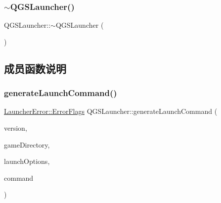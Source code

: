 \mbox{\label{class_q_g_s_launcher_af7cf86d1477700c96475366b8232766d}} 
\subsubsection{\texorpdfstring{$\sim$\+Q\+G\+S\+Launcher()}{~QGSLauncher()}}
{\footnotesize\ttfamily Q\+G\+S\+Launcher\+::$\sim$\+Q\+G\+S\+Launcher (\begin{DoxyParamCaption}{ }\end{DoxyParamCaption})\hspace{0.3cm}{\ttfamily [virtual]}}



\subsection{成员函数说明}
\mbox{\label{class_q_g_s_launcher_a56b1aaf3040498f81a00221cdddb75c0}} 
\subsubsection{\texorpdfstring{generate\+Launch\+Command()}{generateLaunchCommand()}}
{\footnotesize\ttfamily \mbox{\hyperlink{namespace_launcher_error_ac3a8c0329368b890069c60ac80628085}{Launcher\+Error\+::\+Error\+Flags}} Q\+G\+S\+Launcher\+::generate\+Launch\+Command (\begin{DoxyParamCaption}\item[{const \mbox{\hyperlink{class_q_g_s_game_version}{Q\+G\+S\+Game\+Version}} \&}]{version,  }\item[{\mbox{\hyperlink{class_q_g_s_game_directory}{Q\+G\+S\+Game\+Directory}} \&}]{game\+Directory,  }\item[{const \mbox{\hyperlink{class_q_g_s_launch_options}{Q\+G\+S\+Launch\+Options}} $\ast$}]{launch\+Options,  }\item[{Q\+String \&}]{command }\end{DoxyParamCaption})\hspace{0.3cm}{\ttfamily [virtual]}}


